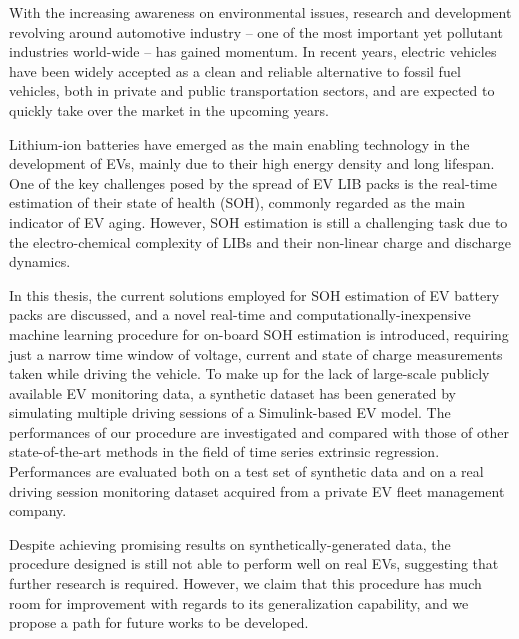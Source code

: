 With the increasing awareness on environmental issues, research and development revolving around automotive industry – one of the most important yet pollutant industries world-wide – has gained momentum. In recent years, electric vehicles have been widely accepted as a clean and reliable alternative to fossil fuel vehicles, both in private and public transportation sectors, and are expected to quickly take over the market in the upcoming years.

Lithium-ion batteries have emerged as the main enabling technology in the development of EVs, mainly due to their high energy density and long lifespan. One of the key challenges posed by the spread of EV LIB packs is the real-time estimation of their state of health (SOH), commonly regarded as the main indicator of EV aging. However, SOH estimation is still a challenging task due to the electro-chemical complexity of LIBs and their non-linear charge and discharge dynamics.

In this thesis, the current solutions employed for SOH estimation of EV battery packs are discussed, and a novel real-time and computationally-inexpensive machine learning procedure for on-board SOH estimation is introduced, requiring just a narrow time window of voltage, current and state of charge measurements taken while driving the vehicle. To make up for the lack of large-scale publicly available EV monitoring data, a synthetic dataset has been generated by simulating multiple driving sessions of a Simulink-based EV model. The performances of our procedure are investigated and compared with those of other state-of-the-art methods in the field of time series extrinsic regression. Performances are evaluated both on a test set of synthetic data and on a real driving session monitoring dataset acquired from a private EV fleet management company.

Despite achieving promising results on synthetically-generated data, the procedure designed is still not able to perform well on real EVs, suggesting that further research is required. However, we claim that this procedure has much room for improvement with regards to its generalization capability, and we propose a path for future works to be developed.
